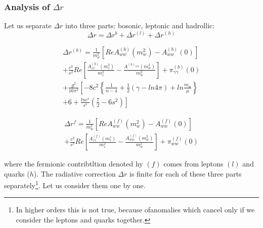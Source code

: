 {\subsubsection*{Analysis of $\Delta r$}

Let us separate $\Delta r$ into three parts: bosonic, leptonic and hadrollic:
\begin{equation*}
\Delta r= \Delta r^{b}+\Delta r^{(l)} + \Delta r^{(h)}\tag{3.13}
\end{equation*}

\begin{multline*}
\Delta r^{(b)} = \frac{1}{m^{2}_{w}} \left[Re A_{ww}^{(b)}(m^{2}_{w})-A^{(b)}_{ww} (0) \right]\\
+\frac{c^{2}}{s^{2}}Re\left[\frac{A_{zz}^{(b)}(m^{2}_{z})}{m^{2}_{z}} - \frac{A^{(b)_{ww}}(m^{2}_{w})}{m^{2}_{w}}\right]+\pi^{(b)}_{\gamma\gamma} (0)\\
+\frac{g^{2}}{16 \pi^{2}}\left[-8c^{2} \left\{ \frac{1}{n-4}+ \frac{1}{2}(\gamma-ln 4\pi)+ ln \frac{m_{w}}{\mu}\right\}\right.\tag{3.14}\\
\left.+6+\frac{ln c^{s}}{s^{s}}\left(\frac{7}{2}-6 s^{2}\right)\right]
\end{multline*}

\begin{multline*}
\Delta r^{f}= \frac{1}{m^{2}_{w}}\left[Re A_{ww}^{(f)}(m^{2}_{w}) -A_{ww}^{(f)}(0) \right]\\
+\frac{c^{2}}{s^{s}}Re \left[ \frac{A_{zz}^{(f)}(m_{z}^{s})}{m^{2}_{z}} -\frac{A_{ww}^{(f)}(m_{w}^{2})}{m^{2}_{w}} \right]+ \pi^{(f)}_{ww}(0)\tag{3.15}
\end{multline*}

where the fermionic contribtltion denoted hy $(f)$ comes from leptons $(l)$ and
quarks ($h$). The radiative correction $\Delta r$ is finite for each of these three parts
separately\footnote{In higher orders this is not true, because ofanomalies which cancel only if we consider  the leptons and quarks together.}. Let us consider them one by one. 

}
